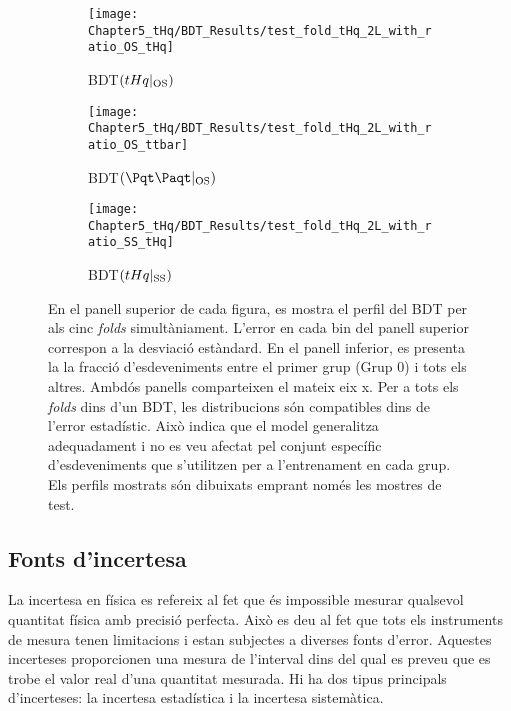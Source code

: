 \begin{figure}[h]
  \centering  
  \begin{subfigure}[b]{0.31\textwidth}
    \centering
    \texttt{[image: Chapter5\_tHq/BDT\_Results/test\_fold\_tHq\_2L\_with\_ratio\_OS\_tHq]}
    \caption{BDT$(tHq|_{\text{OS}})$}
     \label{fig:resum:OS_ScoresCombo:tHq}
  \end{subfigure}
  \hfill
  \begin{subfigure}[b]{0.31\textwidth}
    \centering
    \texttt{[image: Chapter5\_tHq/BDT\_Results/test\_fold\_tHq\_2L\_with\_ratio\_OS\_ttbar]}
    \caption{BDT$(\ttbar|_{\text{OS}})$}
     \label{fig:resum:BDT:OS_ScoresCombo_ttbar}
  \end{subfigure}
    \hfill
  \begin{subfigure}[b]{0.31\textwidth}
    \centering
    \texttt{[image: Chapter5\_tHq/BDT\_Results/test\_fold\_tHq\_2L\_with\_ratio\_SS\_tHq]}
    \caption{BDT$(tHq|_{\text{SS}})$}
     \label{fig:resum:BDT:SS_ScoresCombo_tHq}
  \end{subfigure}
  \caption{En el panell superior de cada figura, es mostra el perfil del BDT per als cinc \textit{folds} simultàniament. 
  L'error en cada bin del panell superior correspon a la desviació estàndard. En el panell inferior, es presenta la la fracció 
  d'esdeveniments entre el primer grup (Grup 0) i tots els altres. Ambdós panells comparteixen el mateix eix x. Per a tots 
  els \textit{folds} dins d'un BDT, les distribucions són compatibles dins de l'error estadístic. Això indica que el model 
  generalitza adequadament i no es veu afectat pel conjunt específic d'esdeveniments que s'utilitzen per a l'entrenament 
  en cada grup. Els perfils mostrats són dibuixats emprant només les mostres de test.}
  \label{fig:resum:BDT:OS_ScoresCombo}
\end{figure}



\FloatBarrier
\subsection{Fonts d’incertesa}
\label{sec:resum:Incerteses}
La incertesa en física es refereix al fet que és impossible mesurar qualsevol quantitat física amb precisió perfecta. 
Això es deu al fet que tots els instruments de mesura tenen limitacions i estan subjectes a diverses fonts d'error.
Aquestes incerteses proporcionen una mesura de l'interval dins del qual es preveu que es trobe el valor real d'una 
quantitat mesurada. Hi ha dos tipus principals d'incerteses: la incertesa estadística i la incertesa sistemàtica.

